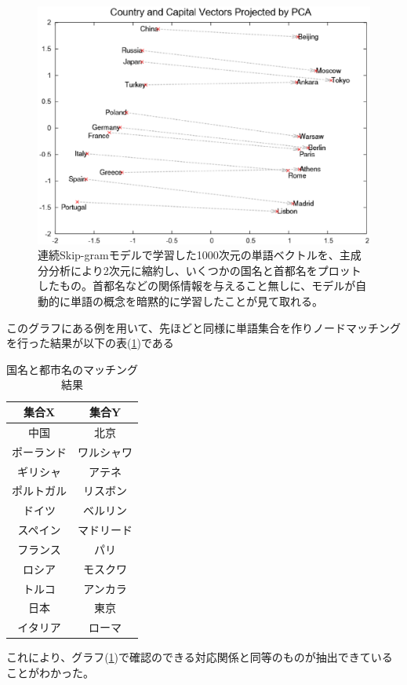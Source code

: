 \begin{figure}[!h]
  \centering
    \label{ccv_pca_m}
  \includegraphics[width=12.5cm]{../images/CCVbyPCAfromM.eps}
  \caption[Country and Capital Vectors Projected by PCA(\cite{drwpc})]{連続Skip-gramモデルで学習した1000次元の単語ベクトルを、主成分分析により2次元に縮約し、いくつかの国名と首都名をプロットしたもの。首都名などの関係情報を与えること無しに、モデルが自動的に単語の概念を暗黙的に学習したことが見て取れる。\cite{drwpc}}
\end{figure}
このグラフにある例を用いて、先ほどと同様に単語集合を作りノードマッチングを行った結果が以下の表(\ref{ccv_c})である
\begin{table}[!h]
  \caption[国名と都市名のマッチング結果]{国名と都市名のマッチング結果}
  \label{ccv_c}
  \begin{center}
    \begin{tabular}{|c||c|} \hline
      集合X & 集合Y \\ \hline \hline
      中国 & 北京 \\
      ポーランド & ワルシャワ \\
      ギリシャ & アテネ \\
      ポルトガル & リスボン \\
      ドイツ & ベルリン \\
      スペイン & マドリード \\
      フランス & パリ \\
      ロシア & モスクワ \\
      トルコ & アンカラ \\
      日本 & 東京 \\
      イタリア & ローマ \\ \hline
    \end{tabular}
  \end{center}
\end{table}
これにより、グラフ(\ref{ccv_pca_m})で確認のできる対応関係と同等のものが抽出できていることがわかった。

